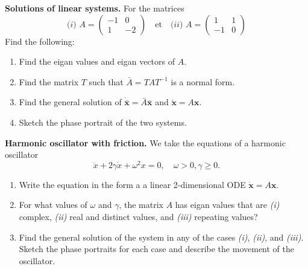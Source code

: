 \documentclass{article}
\begin{document}
\begin{question}
  \textbf{Solutions of linear systems.} For the matrices
  \begin{equation}
    \textit{(i)}\,\, A =
    \begin{pmatrix}
      -1 & 0\\
      1 & -2
    \end{pmatrix}
    \quad\text{et}\quad
    \textit{(ii)}\,\,
    A =
    \begin{pmatrix}
      1 & 1\\
      -1 & 0
    \end{pmatrix}
  \end{equation}
  Find the following:
  \begin{enumerate}[label=(\alph*)]
    \item Find the eigan values and eigan vectors of $A$.
    \item Find the matrix $T$ such that $\bar A= TAT^{-1}$ is a normal form.
    \item Find the general solution of $\dot {\bm{\bar x}} = \bar A\bm{\bar x}$ and $\dot {\bm{x}} = A\bm{x}$.
    \item Sketch the phase portrait of the two systems.
      \end{enumerate}
\end{question}

\begin{question}
  \textbf{Harmonic oscillator with friction.}
  We take the equations of a harmonic oscillator
  \begin{equation}
    \ddot x + 2\gamma \dot x + \omega^2 x = 0, \quad \omega > 0, \gamma \geqslant 0.
  \end{equation}
  \begin{enumerate}[label=(\alph*)]
    \item Write the equation in the form a a linear 2-dimensional ODE $\dot {\bm x} = A \bm x$.
    \item For what values of $\omega$ and $\gamma$, the matrix $A$ has eigan values that are \textit{(i)} complex, \textit{(ii)} real and distinct values, and \textit{(iii)} repeating values?
    \item Find the general solution of the system in any of the cases \textit{(i)}, \textit{(ii)}, and \textit{(iii)}. Sketch the phase portraits for each case and describe the movement of the oscillator. 
    \end{enumerate}
\end{question}
\end{document}
